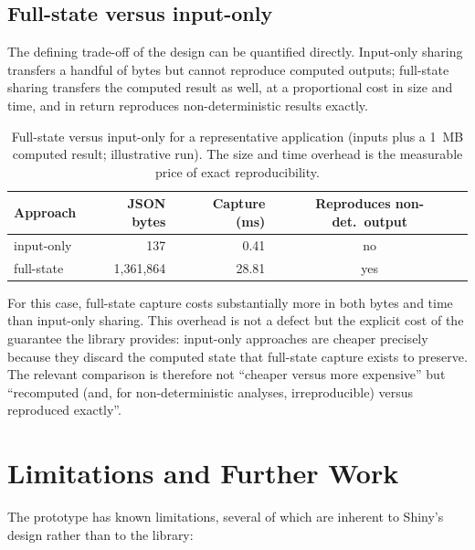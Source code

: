 \documentclass[11pt,a4paper]{article}
\begin{document}
\subsection{Full-state versus input-only}

The defining trade-off of the design can be quantified directly. Input-only
sharing transfers a handful of bytes but cannot reproduce computed outputs;
full-state sharing transfers the computed result as well, at a proportional cost
in size and time, and in return reproduces non-deterministic results exactly.

\begin{table}[h]
\centering
\begin{tabular}{lrrc}
\toprule
\textbf{Approach} & \textbf{JSON bytes} & \textbf{Capture (ms)} & \textbf{Reproduces non-det.\ output} \\
\midrule
input-only  & 137        & 0.41  & no  \\
full-state  & 1{,}361{,}864 & 28.81 & yes \\
\bottomrule
\end{tabular}
\caption{Full-state versus input-only for a representative application
(inputs plus a 1~MB computed result; illustrative run). The size and time
overhead is the measurable price of exact reproducibility.}
\label{tab:bench-tradeoff}
\end{table}

For this case, full-state capture costs substantially more in both bytes and time
than input-only sharing. This overhead is not a defect but the explicit cost of
the guarantee the library provides: input-only approaches are cheaper precisely
because they discard the computed state that full-state capture exists to
preserve. The relevant comparison is therefore not ``cheaper versus more
expensive'' but ``recomputed (and, for non-deterministic analyses, irreproducible)
versus reproduced exactly''.

\section{Limitations and Further Work}

The prototype has known limitations, several of which are inherent to Shiny's
design rather than to the library:
\end{document}
